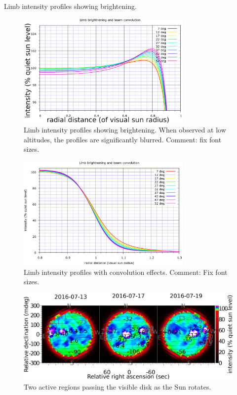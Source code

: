 \documentclass{aa}
\begin{document}
Limb intensity profiles showing brightening. 
\begin{figure}
\centering
\includegraphics[width=8.5cm]{limbmodel_profiles1.png}
\caption{Limb intensity profiles showing brightening. When observed at low altitudes, the profiles are significantly blurred. Comment: fix font sizes.}
\label{limb_brightening1}
\end{figure}

\begin{figure}
\centering
\includegraphics[width=8.5cm]{limbmodel_profiles2.png}
\caption{Limb intensity profiles with convolution effects. Comment: Fix font sizes.}
\label{limb_brightening2}
\end{figure}

\begin{figure}
\centering
\includegraphics[width=\textwidth]{maptrack1.png}
\caption{Two active regions passing the visible disk as the Sun rotates.}
\label{maptrack1}
\end{figure}
\end{document}
